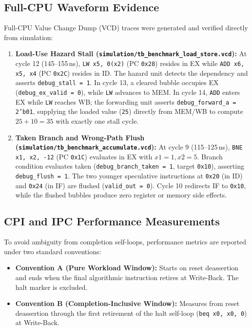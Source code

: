 \documentclass[conference]{IEEEtran}
\begin{document}
\subsection{Full-CPU Waveform Evidence}
Full-CPU Value Change Dump (VCD) traces were generated and verified directly from simulation:
\begin{enumerate}
    \item \textbf{Load-Use Hazard Stall (\texttt{simulation/tb\_benchmark\_load\_store.vcd}):} 
    At cycle 12 (145--155\,ns), \texttt{LW x5, 0(x2)} (PC \texttt{0x28}) resides in EX while \texttt{ADD x6, x5, x4} (PC \texttt{0x2C}) resides in ID. The hazard unit detects the dependency and asserts \texttt{debug\_stall = 1}. In cycle 13, a cleared bubble occupies EX (\texttt{debug\_ex\_valid = 0}), while \texttt{LW} advances to MEM. In cycle 14, \texttt{ADD} enters EX while \texttt{LW} reaches WB; the forwarding unit asserts \texttt{debug\_forward\_a = 2'b01}, supplying the loaded value (\texttt{25}) directly from MEM/WB to compute $25 + 10 = 35$ with exactly one stall cycle.
    \item \textbf{Taken Branch and Wrong-Path Flush (\texttt{simulation/tb\_benchmark\_accumulate.vcd}):}
    At cycle 9 (115--125\,ns), \texttt{BNE x1, x2, -12} (PC \texttt{0x1C}) evaluates in EX with $x1=1, x2=5$. Branch condition evaluates taken (\texttt{debug\_branch\_taken = 1}, target \texttt{0x10}), asserting \texttt{debug\_flush = 1}. The two younger speculative instructions at \texttt{0x20} (in ID) and \texttt{0x24} (in IF) are flushed (\texttt{valid\_out = 0}). Cycle 10 redirects IF to \texttt{0x10}, while the flushed bubbles produce zero register or memory side effects.
\end{enumerate}

\subsection{CPI and IPC Performance Measurements}
To avoid ambiguity from completion self-loops, performance metrics are reported under two standard conventions:
\begin{itemize}
    \item \textbf{Convention A (Pure Workload Window):} Starts on reset deassertion and ends when the final algorithmic instruction retires at Write-Back. The halt marker is excluded.
    \item \textbf{Convention B (Completion-Inclusive Window):} Measures from reset deassertion through the first retirement of the halt self-loop (\texttt{beq x0, x0, 0}) at Write-Back.
\end{itemize}
\end{document}
